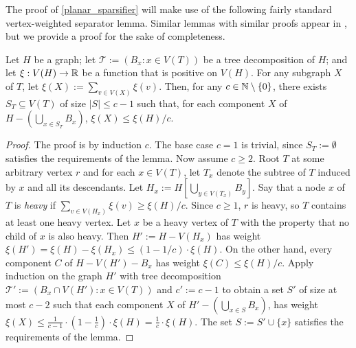 \documentclass{patmorin}
\renewcommand{\ge}{\geqslant}
\renewcommand{\le}{\leqslant}
\renewcommand{\geq}{\geqslant}
\newcommand{\david}[1]{{\color{orange} David: #1}}
\newcommand{\defin}[1]{\emph{\textcolor{brightmaroon}{#1}}}
\begin{document}

The proof of \cref{planar_sparsifier} will make use of the following fairly standard vertex-weighted separator lemma.  Similar lemmas with similar proofs appear in  \citet{robertson.seymour:graph}, but we provide a proof for the sake of completeness.


\begin{lem}\label{weighted_separator}
    Let $H$ be a graph; let $\mathcal{T}:=(B_x:x\in V(T))$ be a tree decomposition of $H$; and let $\xi:V(H)\to\mathbb{R}$ be a function that is positive on $V(H)$.  For any subgraph $X$ of $T$, let       $\xi(X):=\sum_{v\in V(X)} \xi(v)$. Then, for any $c\in\mathbb{N}\setminus\{0\}$, there exists $S_T\subseteq V(T)$ of size $|S|\le c-1$ such that, for each component $X$ of $H-(\bigcup_{x\in S_T} B_x)$, $\xi(X)\le \xi(H)/c$.
\end{lem}

\begin{proof}
  The proof is by induction $c$.  The base case $c=1$ is trivial, since $S_T:=\emptyset$ satisfies the requirements of the lemma.  Now assume $c\ge 2$.  Root $T$ at some arbitrary vertex $r$ and for each $x\in V(T)$, let $T_x$ denote the subtree of $T$ induced by $x$ and all its descendants.  Let $H_x:=H[\bigcup_{y\in V(T_x)} B_y]$.  Say that a node $x$ of $T$ is \defin{heavy} if $\sum_{v\in V(H_x)} \xi(v) \ge \xi(H)/c$. Since $c\ge 1$, $r$ is heavy, so $T$ contains at least one heavy vertex. Let $x$ be a heavy vertex of $T$ with the property that no child of $x$ is also heavy.  Then $H':=H-V(H_x)$ has weight $\xi(H') = \xi(H)-\xi(H_x) \le (1-1/c)\cdot\xi(H)$.  On the other hand, every component $C$ of $H-V(H')-B_x$ has weight $\xi(C) \le \xi(H)/c$.  Apply induction on the graph $H'$ with tree decomposition $\mathcal{T}':=(B_x\cap V(H'):x\in V(T))$ and $c':=c-1$ to obtain a set $S'$ of size at most $c-2$ such that each component $X$ of $H'-(\bigcup_{x\in S} B_x)$, has weight $\xi(X) \le \tfrac{1}{c-1}\cdot(1-\tfrac{1}{c})\cdot\xi(H) = \tfrac{1}{c}\cdot \xi(H)$.  The set $S:=S'\cup\{x\}$ satisfies the requirements of the lemma.
\end{proof}
\end{document}
